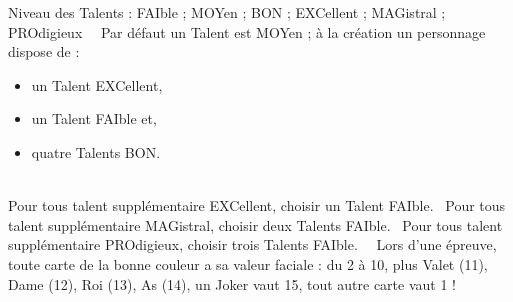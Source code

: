 \documentclass[a5paper,pagesize,french]{book}
\begin{document}
\begin{minipage}[ht]{0.95\textwidth}
	Niveau des Talents : FAIble ; MOYen ; BON ; EXCellent ; MAGistral ; PROdigieux~\newline~\newline
	Par défaut un Talent est MOYen ; à la création un personnage dispose de : 
	\begin{itemize}
		\item un Talent EXCellent, 
		\item un Talent FAIble et, 
		\item quatre Talents BON. 
	\end{itemize}~\\
	Pour tous talent supplémentaire EXCellent, choisir un Talent FAIble.~\newline
	Pour tous talent supplémentaire MAGistral, choisir deux Talents FAIble.~\newline
	Pour tous talent supplémentaire PROdigieux, choisir trois Talents FAIble.~\newline~\newline
	Lors d'une épreuve, toute carte de la bonne couleur a sa valeur faciale : du 2 à 10, plus Valet (11), Dame (12), Roi (13), As (14), un Joker vaut 15, tout autre carte vaut 1 !
\end{minipage}~\\~\\

\end{document}
